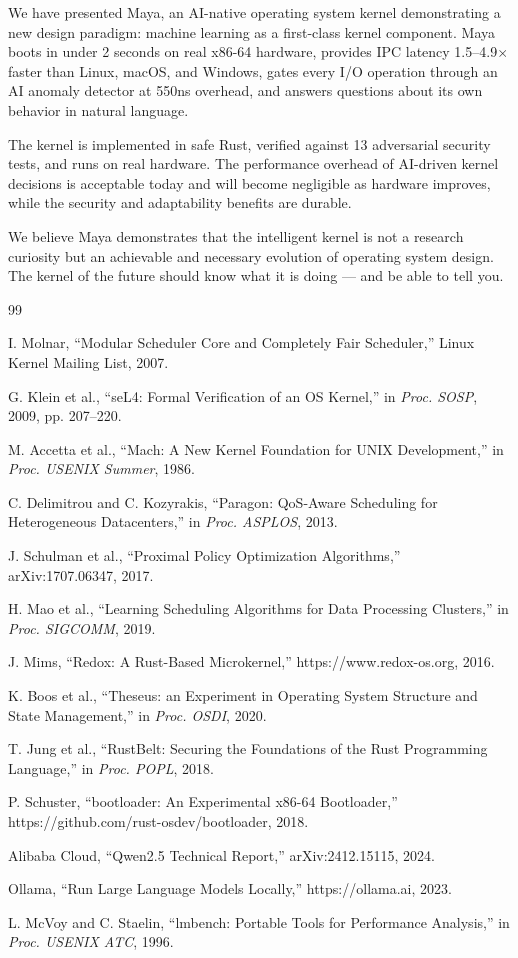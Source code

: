 \documentclass[letterpaper,twocolumn,10pt]{article}
\begin{document}
We have presented Maya, an AI-native operating
system kernel demonstrating a new design
paradigm: machine learning as a first-class
kernel component. Maya boots in under 2 seconds
on real x86-64 hardware, provides IPC latency
1.5--4.9$\times$ faster than Linux, macOS,
and Windows, gates every I/O operation through
an AI anomaly detector at 550ns overhead, and
answers questions about its own behavior in
natural language.

The kernel is implemented in safe Rust,
verified against 13 adversarial security
tests, and runs on real hardware. The
performance overhead of AI-driven kernel
decisions is acceptable today and will
become negligible as hardware improves,
while the security and adaptability benefits
are durable.

We believe Maya demonstrates that the
intelligent kernel is not a research curiosity
but an achievable and necessary evolution of
operating system design. The kernel of the
future should know what it is doing --- and
be able to tell you.


\begin{thebibliography}{99}

I. Molnar, ``Modular Scheduler Core and
Completely Fair Scheduler,'' Linux Kernel
Mailing List, 2007.

G. Klein et al., ``seL4: Formal Verification
of an OS Kernel,'' in \textit{Proc. SOSP},
2009, pp. 207--220.

M. Accetta et al., ``Mach: A New Kernel
Foundation for UNIX Development,'' in
\textit{Proc. USENIX Summer}, 1986.

C. Delimitrou and C. Kozyrakis, ``Paragon:
QoS-Aware Scheduling for Heterogeneous
Datacenters,'' in \textit{Proc. ASPLOS},
2013.

J. Schulman et al., ``Proximal Policy
Optimization Algorithms,'' arXiv:1707.06347,
2017.

H. Mao et al., ``Learning Scheduling
Algorithms for Data Processing Clusters,''
in \textit{Proc. SIGCOMM}, 2019.

J. Mims, ``Redox: A Rust-Based Microkernel,''
https://www.redox-os.org, 2016.

K. Boos et al., ``Theseus: an Experiment
in Operating System Structure and State
Management,'' in \textit{Proc. OSDI}, 2020.

T. Jung et al., ``RustBelt: Securing the
Foundations of the Rust Programming Language,''
in \textit{Proc. POPL}, 2018.

P. Schuster, ``bootloader: An Experimental
x86-64 Bootloader,''
https://github.com/rust-osdev/bootloader,
2018.

Alibaba Cloud, ``Qwen2.5 Technical Report,''
arXiv:2412.15115, 2024.

Ollama, ``Run Large Language Models Locally,''
https://ollama.ai, 2023.

L. McVoy and C. Staelin, ``lmbench: Portable
Tools for Performance Analysis,'' in
\textit{Proc. USENIX ATC}, 1996.

\end{thebibliography}
\end{document}
